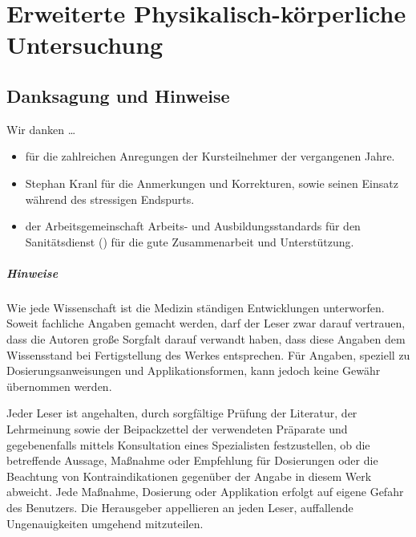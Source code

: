 \def\ChapterCode{PKU}
\chapter
[\CO{[PKU]} Erweiterte Physikalisch-körperliche Untersuchung]
{Erweiterte Physikalisch-körperliche Untersuchung}
\label{chp:PKU}



\section*{Danksagung und Hinweise}

\begin{figure}[H]

\end{figure}


\noindent Wir danken \ldots
\begin{itemize}
  \item[\ldots] für die zahlreichen Anregungen der
  Kursteilnehmer der vergangenen Jahre.
  \item[\ldots] Stephan Kranl für die Anmerkungen und
  Korrekturen, sowie seinen Einsatz während des stressigen
  Endspurts.
  \item[\ldots] der {\sffamily Arbeitsgemeinschaft {\color{ubuntured}Arbeits- und Ausbildungsstandards} {\color{darkBlue}für den
  Sanitätsdienst}} (\ARGEAASS) für die
  gute Zusammenarbeit und Unterstützung.
\end{itemize}

\paragraph{Hinweise}
Wie jede Wissenschaft ist die Medizin ständigen Ent\-wicklungen
unterworfen. Soweit fachliche Angaben ge\-macht werden, darf der Leser
zwar darauf ver\-trau\-en, dass die Autoren große Sorg\-falt
da\-rauf verwandt haben, dass diese An\-ga\-ben dem Wissens\-stand bei
Ferti\-gstel\-lung des Werkes entsprechen. Für Angaben,
spe\-ziell zu Dosierungsanweisungen und
Ap\-plikations\-formen, kann jedoch keine Ge\-währ übernommen werden. 

Jeder Leser ist angehalten, durch
sorg\-fältige Prü\-fung der Literatur, der Lehrmeinung so\-wie der
Beipackzettel der ver\-wendeten Präparate und gegebenenfalls
mittels Konsultation eines Spezialisten fest\-zustellen, ob
die betreffende Aussage, Maßnahme oder Empfehlung für
Do\-sierungen oder die Beachtung von Kon\-tra\-indi\-ka\-tionen gegenüber der Angabe in diesem
Werk abweicht. Jede Maßnahme, Dosierung oder Ap\-pli\-kation
erfolgt auf eigene Gefahr des Be\-nutzers. 
Die Herausgeber appellieren an jeden Le\-ser, 
auffallende Un\-ge\-nau\-igkei\-ten umgehend mitzuteilen.

